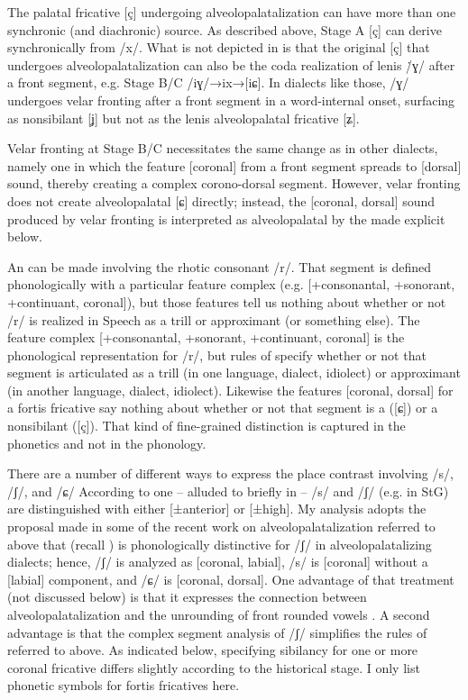 The palatal fricative [ç] undergoing alveolopalatalization can have more than one synchronic (and diachronic) source. As described above, Stage A [ç] can derive synchronically from /x/. What is not depicted in  is that the original [ç] that undergoes alveolopalatalization can also be the coda realization of lenis \.{/}ɣ/ after a front segment, e.g. Stage B/C /iɣ/→{\textbar}ix{\textbar}→[iɕ]. In dialects like those, /ɣ/ undergoes velar fronting after a front segment in a word-internal onset, surfacing as nonsibilant [ʝ] but not as the lenis alveolopalatal fricative [ʑ].

Velar fronting at Stage B/C necessitates the same change as in other dialects, namely one in which the feature [coronal] from a front segment spreads to [dorsal] sound, thereby creating a complex corono-dorsal segment. However, velar fronting does not create alveolopalatal [ɕ] directly; instead, the [coronal, dorsal] sound produced by velar fronting is interpreted as alveolopalatal by the  made explicit below.

An  can be made involving the rhotic consonant /r/. That segment is defined phonologically with a particular feature complex (e.g. [+consonantal, +sonorant, +continuant, coronal]), but those features tell us nothing about whether or not /r/ is realized in Speech as a trill or approximant (or something else). The feature complex [+consonantal, +sonorant, +continuant, coronal] is the phonological representation for /r/, but rules of  specify whether or not that segment is articulated as a trill (in one language, dialect, idiolect) or approximant (in another language, dialect, idiolect). Likewise the features [coronal, dorsal] for a fortis fricative say nothing about whether or not that segment is a  ([ɕ]) or a nonsibilant ([ç]). That kind of fine-grained distinction is captured in the phonetics and not in the phonology.

There are a number of different ways to express the place contrast involving /s/, /ʃ/, and /ɕ/ According to one -- alluded to briefly in  -- /s/ and /ʃ/ (e.g. in StG) are distinguished with either [±anterior] or [±high]. My analysis adopts the proposal made in some of the recent work on alveolopalatalization referred to above that  (recall ) is phonologically distinctive for /ʃ/ in alveolopalatalizing dialects; hence, /ʃ/ is analyzed as [coronal, labial], /s/ is [coronal] without a [labial] component, and /ɕ/ is [coronal, dorsal]. One advantage of that treatment (not discussed below) is that it expresses the connection between alveolopalatalization and the unrounding of front rounded vowels \citep{Hall2014b}. A second advantage is that the complex segment analysis of /ʃ/ simplifies the rules of  referred to above. As indicated below,  specifying sibilancy for one or more coronal fricative differs slightly according to the historical stage. I only list phonetic symbols for fortis fricatives here.

